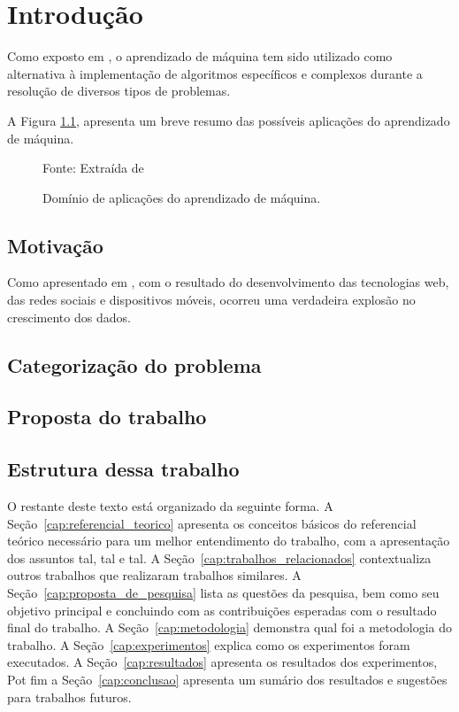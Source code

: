 \chapter{Introdução}

Como exposto em \cite{Torralba2008}, o aprendizado de máquina tem sido utilizado como alternativa à implementação de algoritmos específicos e complexos durante a resolução de diversos tipos de problemas. 

\lipsum[6]

A Figura \ref{fig:mlapplications}, apresenta um breve resumo das possíveis aplicações do aprendizado de máquina.

\begin{figure}[ht]
    \centering
    \caption{Domínio de aplicações do aprendizado de máquina.}
            {Fonte: Extraída de \cite{ApplicationMachineLearning}}
    \label{fig:mlapplications}
\end{figure}

\lipsum[7-8]

\section{Motivação}

Como apresentado em \cite{mohri2018foundations}, com o resultado do desenvolvimento das tecnologias web, das redes sociais e dispositivos móveis, ocorreu uma verdadeira explosão no crescimento dos dados. 

\lipsum[9-16]


\section{Categorização do problema}

\lipsum[17-18]

\section{Proposta do trabalho}

\lipsum[19-21]

\section{Estrutura dessa trabalho}

O restante deste texto está organizado da seguinte forma. A Seção~\ref{cap:referencial_teorico} apresenta os conceitos básicos do referencial teórico necessário para um melhor entendimento do trabalho, com a apresentação dos assuntos tal, tal e tal. A Seção~\ref{cap:trabalhos_relacionados} contextualiza outros trabalhos que realizaram trabalhos similares. A Seção~\ref{cap:proposta_de_pesquisa} lista as questões da pesquisa, bem como seu objetivo principal e concluindo com as contribuições esperadas com o resultado final do trabalho. A Seção~\ref{cap:metodologia} demonstra qual foi a metodologia do trabalho. A Seção~\ref{cap:experimentos} explica como os experimentos foram executados. A Seção~\ref{cap:resultados} apresenta os resultados dos experimentos, Pot fim a Seção~\ref{cap:conclusao} apresenta um sumário dos resultados e sugestões para trabalhos futuros. 